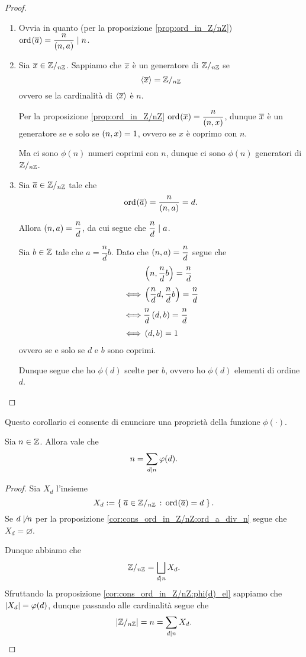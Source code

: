 \begin{proof}
    \begin{enumerate}[label={(\roman*)}]
        \item Ovvia in quanto (per la proposizione \ref{prop:ord_in_Z/nZ}) $\ord{\eqcl a} = \dfrac{n}{\mcd{n}{a}} \divides n$.
        \item Sia $\eqcl x \in \Zmod{n}$. Sappiamo che $\eqcl x$ è un generatore di $\mathbb{Z}/_{n\mathbb{Z}}$ se \[
            \gen*{\eqcl x} = \Zmod n    
        \] ovvero se la cardinalità di $\gen*{\eqcl x}$ è $n$.

        Per la proposizione \ref{prop:ord_in_Z/nZ} $\ord{\eqcl x} = \dfrac{n}{\mcd{n}{x}}$, dunque $\eqcl x$ è un generatore se e solo se $\left(n, x\right) = 1$, ovvero se $x$ è coprimo con $n$.

        Ma ci sono $\phi(n)$ numeri coprimi con $n$, dunque ci sono $\phi(n)$ generatori di $\mathbb{Z}/_{n\mathbb{Z}}$.
        \item Sia $\eqcl a \in \Zmod n$ tale che \[
            \ord{\eqcl a} = \frac{n}{\mcd{n}{a}} = d.    
        \]

        Allora $\left(n, a\right) = \dfrac{n}{d}$, da cui segue che $\dfrac{n}{d} \mid a$.

        Sia $b \in \mathbb{Z}$ tale che $a = \dfrac{n}{d}b$. Dato che $\left(n, a\right) = \dfrac{n}{d}$ segue che \begin{align*}
            &\left(n, \frac{n}{d}b\right) = \frac{n}{d}\\[3pt]
            \iff &\left(\frac{n}{d}d, \frac{n}{d}b\right) = \frac{n}{d}\\[3pt]
            \iff &\frac{n}{d}\left(d, b\right) = \frac{n}{d}\\[3pt]
            \iff &\left(d, b\right) = 1
        \end{align*}
        ovvero se e solo se $d$ e $b$ sono coprimi.

        Dunque segue che ho $\phi(d)$ scelte per $b$, ovvero ho $\phi(d)$ elementi di ordine $d$.
    \end{enumerate}
\end{proof}

Questo corollario ci consente di enunciare una proprietà della funzione $\phi(\cdot)$.

\begin{corollary}
    Sia $n \in \mathbb{Z}$. Allora vale che \[
        n = \sum_{d \mid n} \varphi(d).    
    \]
\end{corollary}
\begin{proof}
    Sia $X_d$ l'insieme \[
        X_d \deq \set{\eqcl a \in \Zmod n \suchthat \ord{\eqcl a} = d}.    
    \]
    Se $d \not\mid n$ per la proposizione \ref{cor:cons_ord_in_Z/nZ:ord_a_div_n} segue che $X_d = \varnothing$.

    Dunque abbiamo che \[
        \mathbb{Z}/_{n\mathbb{Z}} = \bigsqcup_{d \mid n} X_d.  
    \] Sfruttando la proposizione \ref{cor:cons_ord_in_Z/nZ:phi(d)_el} sappiamo che $\lvert X_d\rvert = \varphi(d)$, dunque passando alle cardinalità segue che \[
        \lvert\mathbb{Z}/_{n\mathbb{Z}}\rvert = n = \sum_{d \mid n} X_d.    
    \]
\end{proof}

